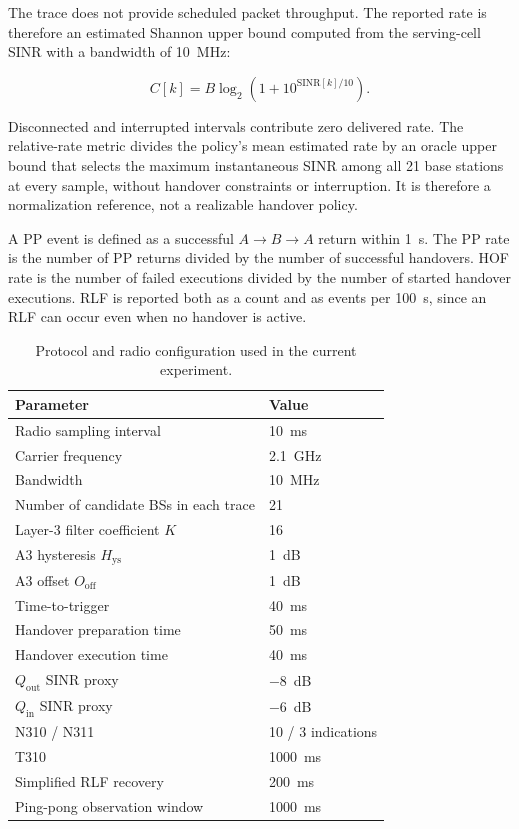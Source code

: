 The trace does not provide scheduled packet throughput. The reported rate is
therefore an estimated Shannon upper bound computed from the serving-cell SINR
with a bandwidth of 10~MHz:

\begin{equation}
C[k] = B\log_2\!\left(1+10^{\mathrm{SINR}[k]/10}\right).
\end{equation}

Disconnected and interrupted intervals contribute zero delivered rate. The
relative-rate metric divides the policy's mean estimated rate by an oracle
upper bound that selects the maximum instantaneous SINR among all 21 base
stations at every sample, without handover constraints or interruption. It is
therefore a normalization reference, not a realizable handover policy.

A PP event is defined as a successful $A\rightarrow B\rightarrow A$ return
within 1~s. The PP rate is the number of PP returns divided by the number of
successful handovers. HOF rate is the number of failed executions divided by
the number of started handover executions. RLF is reported both as a count and
as events per 100~s, since an RLF can occur even when no handover is active.

\begin{table}[t]
\centering
\caption{Protocol and radio configuration used in the current experiment.}
\label{tab:protocol-configuration}
\begin{tabular}{@{}ll@{}}
\toprule
Parameter & Value \\
\midrule
Radio sampling interval & 10~ms \\
Carrier frequency & 2.1~GHz \\
Bandwidth & 10~MHz \\
Number of candidate BSs in each trace & 21 \\
Layer-3 filter coefficient $K$ & 16 \\
A3 hysteresis $H_{\mathrm{ys}}$ & 1~dB \\
A3 offset $O_{\mathrm{off}}$ & 1~dB \\
Time-to-trigger & 40~ms \\
Handover preparation time & 50~ms \\
Handover execution time & 40~ms \\
$Q_{\mathrm{out}}$ SINR proxy & $-8$~dB \\
$Q_{\mathrm{in}}$ SINR proxy & $-6$~dB \\
N310 / N311 & 10 / 3 indications \\
T310 & 1000~ms \\
Simplified RLF recovery & 200~ms \\
Ping-pong observation window & 1000~ms \\
\bottomrule
\end{tabular}
\end{table}

